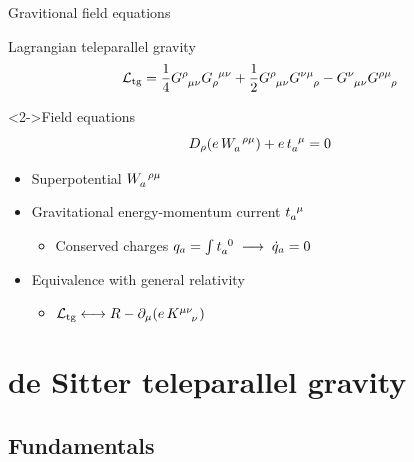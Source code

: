 \documentclass[t,hyperref={bookmarks=false}]{beamer}
\newcommand{\ind}{\indices}
\newcommand{\pd}{\partial}
\newcommand{\bitem}{\begin{itemize}}
\newcommand{\eitem}{\end{itemize}}
\begin{document}
\begin{frame}{Gravitional field equations}

\begin{block}{Lagrangian teleparallel gravity}
\begin{equation*}
  \mathcal{L}_\text{tg} = \frac{1}{4} G \ind{^\rho_{\mu\nu}} 
  G\ind{_\rho^{\mu\nu}} + \frac{1}{2} G\ind{^\rho_{\mu\nu}} 
  G\ind{^{\nu\mu}_\rho} - G\ind{^\nu_{\mu\nu}} 
  G\ind{^{\rho\mu}_\rho}
\end{equation*}
\end{block}

\begin{block}<2->{Field equations}
\begin{equation*}
  D_\rho (e\, W\ind{_a^{\rho\mu}}) + e\, t\ind{_a^\mu} = 0
\end{equation*}
\end{block}

\bitem
\item<2-> Superpotential $W\ind{_a^{\rho\mu}}$
\item<2-> Gravitational energy-momentum current $t\ind{_a^\mu}$
  \bitem
  \item Conserved charges $q_a = \int t\ind{_a^0} 
    \;\longrightarrow\;\dot{q}_a = 0$
  \eitem
  \eitem\bitem
\item<3-> Equivalence with general relativity
  \bitem
  \item
    $\mathcal{L}_\text{tg} \longleftrightarrow R - \pd_\mu (e\, 
    K\ind{^{\mu\nu}_\nu})$
  \eitem
\eitem
\end{frame}

\section{de Sitter teleparallel gravity}

\subsection{Fundamentals}
\end{document}
